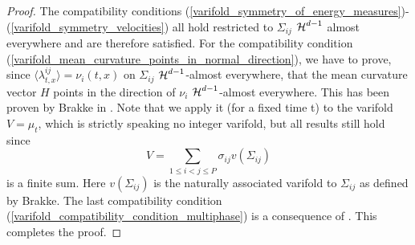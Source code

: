 \begin{proof}
	The compatibility conditions 
	(\ref{varifold_symmetry_of_energy_measures})-(\ref{varifold_symmetry_velocities})
	all hold restricted to $ \Sigma_{ i j } $ $ \operatorname{\mathcal{H}}^{ d - 1 } $ almost 
	everywhere and are therefore satisfied.
	For the compatibility condition 
	(\ref{varifold_mean_curvature_points_in_normal_direction}), we have to 
	prove, since $ \langle \lambda_{ t , x }^{ i j } \rangle = \nu_{ i } ( t , 
	x ) $ on $ \Sigma_{ i j } $ $ \operatorname{\mathcal{H}}^{ d- 1 } $-almost everywhere, that the 
	mean curvature vector $ H $ points in the direction of $ \nu_{ i } $ $ 
	\operatorname{\mathcal{H}}^{ d - 1 } $-almost everywhere. This has been proven by Brakke in 
	\cite[Thm.~5.8]{brakke_kenneth_motion_of_surface_by_mean_curvature}. Note 
	that we apply it (for a fixed time t) to the varifold $ V = \mu_{ t } $, 
	which is strictly speaking no integer varifold, but all results still hold 
	since 
	\begin{equation*}
		V = 
		\sum_{ 1 \leq i < j \leq P }
			\sigma_{ i j }
			v ( \Sigma_{ i j } )
	\end{equation*}
	is a finite sum. Here $ v ( \Sigma_{ i j } ) $ is the naturally associated 
	varifold to $ \Sigma_{ i j } $ as defined by Brakke.
	The last compatibility condition 
	(\ref{varifold_compatibility_condition_multiphase}) is a consequence of 
	. 
	This completes the proof.
\end{proof}